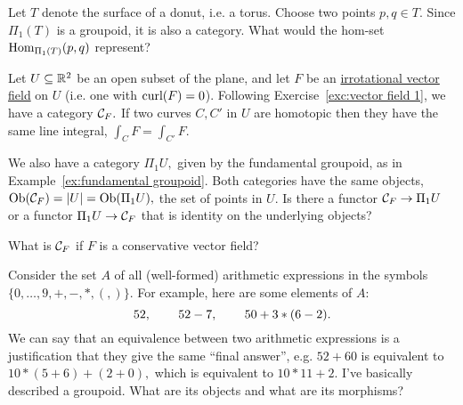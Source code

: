 \documentclass[../main/CT4S-EN-RU]{subfiles}
\begin{document}
\begin{exampleRUS}\label{ex:fundamental groupoid}
\end{exampleRUS}

\begin{exerciseENG}
Let $T$ denote the surface of a donut, i.e. a torus. Choose two points $p,q\in T.$ Since $\Pi_1(T)$ is a groupoid, it is also a category. What would the hom-set $\operatorname{Hom}_{\Pi_1(T)}(p,q)$ represent?
\end{exerciseENG}

\begin{exerciseRUS}
\end{exerciseRUS}

\begin{exerciseENG}
Let $U\subseteq{\mathbb R}^2$ be an open subset of the plane, and let $F$ be an \href{http://en.wikipedia.org/wiki/Conservative_vector_field#Irrotational_vector_fields}{\text irrotational vector field} on $U$ (i.e. one with $\textnormal{curl}(F)=0$). Following Exercise~\ref{exc:vector field 1}, we have a category $\mathcal{C}_F.$ If two curves $C,C'$ in $U$ are homotopic then they have the same line integral, $\int_CF=\int_{C'}F.$

We also have a category $\Pi_1U,$ given by the fundamental groupoid, as in Example~\ref{ex:fundamental groupoid}. Both categories have the same objects, $\operatorname{Ob}(\mathcal{C}_F)=|U|=\operatorname{Ob}(\Pi_1U),$ the set of points in $U.$
\sexc Is there a functor $\mathcal{C}_F\rightarrow\Pi_1U$ or a functor $\Pi_1U\rightarrow\mathcal{C}_F$ that is identity on the underlying objects? 
\item What is $\mathcal{C}_F$ if $F$ is a conservative vector field?
\endsexc
\end{exerciseENG}

\begin{exerciseRUS}
\end{exerciseRUS}

\begin{exerciseENG}
Consider the set $A$ of all (well-formed) arithmetic expressions in the symbols $\{0,\ldots,9,+,-,*,(,)\}.$ For example, here are some elements of $A$: $$52,\hspace{.3in} 52-7,\hspace{.3in} 50+3*(6-2).$$ We can say that an equivalence between two arithmetic expressions is a justification that they give the same “final answer”, e.g. $52+60$ is equivalent to $10*(5+6)+(2+0),$ which is equivalent to $10*11+2.$ I've basically described a groupoid. What are its objects and what are its morphisms?
\end{exerciseENG}
\end{document}
